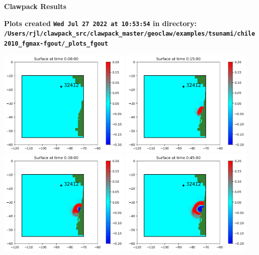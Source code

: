 \documentclass[11pt]{article}
\begin{document}
        \begin{center}{\Large\bf Clawpack Results}\vskip 5pt
        
        \bf Plots created {\tt Wed Jul 27 2022 at 10:53:54} in directory: \vskip 5pt
        \verb+/Users/rjl/clawpack_src/clawpack_master/geoclaw/examples/tsunami/chile2010_fgmax-fgout/_plots_fgout+
        \end{center}
        \vskip 5pt
        \includegraphics[width=0.475\textwidth]{fgout0001frame0001fig0.png}
\vskip 10pt 
\includegraphics[width=0.475\textwidth]{fgout0001frame0002fig0.png}
\vskip 10pt 
\includegraphics[width=0.475\textwidth]{fgout0001frame0003fig0.png}
\vskip 10pt 
\includegraphics[width=0.475\textwidth]{fgout0001frame0004fig0.png}
\end{document}
